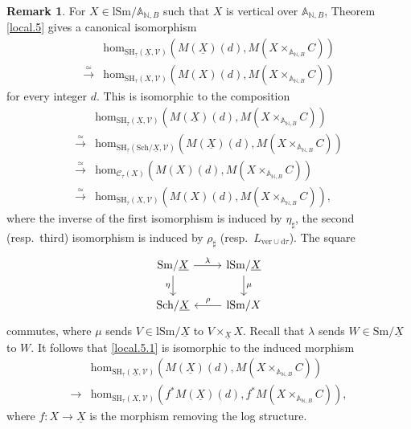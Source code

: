 \documentclass[10pt]{amsart}
\theoremstyle{definition}
\newtheorem{rmk}[thm]{Remark}
\theoremstyle{remark}
\numberwithin{equation}{subsection}
\newcommand{\A}{\mathbb{A}}
\newcommand{\N}{\mathbb{N}}
\newcommand{\cV}{\mathcal{V}}
\newcommand{\sC}{\mathscr{C}}
\newcommand{\ul}{\underline}
\newcommand{\Sm}{\mathrm{Sm}}
\newcommand{\SH}{\mathrm{SH}}
\newcommand{\map}{\mathrm{hom}}
\newcommand{\Sch}{\mathrm{Sch}}
\newcommand{\lSm}{\mathrm{lSm}}
\newcommand{\ver}{\mathrm{ver}}
\newcommand{\dtau}{\mathrm{d}\tau}
\begin{document}
\begin{rmk}
\label{local.9}
For $X\in \lSm/\A_{\N,B}$ such that $X$ is vertical over $\A_{\N,B}$,
Theorem \ref{local.5} gives a canonical isomorphism
\begin{equation}
\label{local.5.1}
\begin{split}
&\map_{\SH_{\ul{\tau}}(\ul{X},\cV)}
(M(\ul{X})(d),M(X\times_{\A_{\N,B}}C))
\\
\xrightarrow{\simeq}&
\map_{\SH_{\tau}(X,\cV)}
(M(X)(d),M(X\times_{\A_{\N,B}}C))
\end{split}
\end{equation}
for every integer $d$.
This is isomorphic to the composition
\begin{align*}
&\map_{\SH_{\ul{\tau}}(\ul{X},\cV)}
(M(\ul{X})(d),M(X\times_{\A_{\N,B}}C))
\\
\xrightarrow{\simeq}&
\map_{\SH_{\ul{\tau}}(\Sch/\ul{X},\cV)}
(M(\ul{X})(d),M(X\times_{\A_{\N,B}}C))
\\
\xrightarrow{\simeq}&
\map_{\sC_{\tau}(X)}
(M(X)(d),M(X\times_{\A_{\N,B}}C))
\\
\xrightarrow{\simeq}&
\map_{\SH_{\tau}(X,\cV)}
(M(X)(d),M(X\times_{\A_{\N,B}}C)),
\end{align*}
where the inverse of the first isomorphism is induced by $\eta_\sharp$, the second (resp.\ third) isomorphism is induced by $\rho_\sharp$ (resp.\ $L_{\ver\cup \dtau}$).
The square
\[
\begin{tikzcd}
\Sm/\ul{X}\ar[r,"\lambda"]\ar[d,"\eta"']&
\lSm/\ul{X}\ar[d,"\mu"]
\\
\Sch/\ul{X}\ar[r,leftarrow,"\rho"]&
\lSm/X
\end{tikzcd}
\]
commutes, where $\mu$ sends $V\in \lSm/\ul{X}$ to $V\times_{\ul{X}} X$.
Recall that $\lambda$ sends $W\in \Sm/\ul{X}$ to $W$.
It follows that \eqref{local.5.1} is isomorphic to the induced morphism
\begin{align*}
&\map_{\SH_{\ul{\tau}}(\ul{X},\cV)}
(M(\ul{X})(d),M(X\times_{\A_{\N,B}}C))
\\
\to &
\map_{\SH_{\tau}(X,\cV)}
(f^*M(\ul{X})(d),f^*M(X\times_{\A_{\N,B}}C)),
\end{align*}
where $f\colon X\to \ul{X}$ is the morphism removing the log structure.
\end{rmk}
\end{document}
